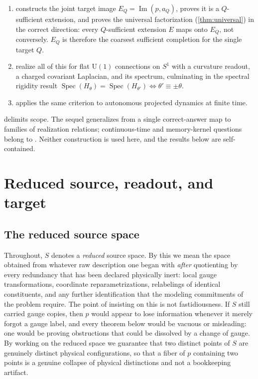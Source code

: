 \documentclass[11pt,reqno]{amsart}
\theoremstyle{plain}
\theoremstyle{definition}
\newcommand{\Uone}{\mathrm{U}(1)}
\newcommand{\Src}{S}
\newcommand{\Spec}{\operatorname{Spec}}
\newcommand{\Img}{\operatorname{Im}}
\begin{document}
\begin{enumerate}
\item {} constructs the joint target image $E_Q=\Img(p,a_Q)$, proves it is a
$Q$-sufficient extension, and proves the universal factorization
(\cref{thm:universal}) in the correct direction: every $Q$-sufficient extension $E$ maps onto
$E_Q$, not conversely. $E_Q$ is therefore the coarsest sufficient completion for the single
target $Q$.

\item {} realize all of this for flat $\Uone$
connections on $S^1$ with a curvature readout, a charged covariant Laplacian, and its spectrum,
culminating in the spectral rigidity result $\Spec(H_\theta)=\Spec(H_{\theta'})
\iff \theta'\equiv\pm\theta$.

\item {} applies the same criterion to autonomous projected dynamics at finite
time.
\end{enumerate}

 delimits scope. The sequel \cite{ShadowIII} generalizes from a single
correct-answer map to families of realization relations; continuous-time and memory-kernel
questions belong to \cite{ShadowV}. Neither construction is used here, and the results below are
self-contained.

\section{Reduced source, readout, and target}\label{sec:setup}

\subsection{The reduced source space}

Throughout, $\Src$ denotes a \emph{reduced} source space. By this we mean the space obtained
from whatever raw description one began with \emph{after} quotienting by every redundancy that
has been declared physically inert: local gauge transformations, coordinate reparametrizations,
relabelings of identical constituents, and any further identification that the modeling
commitments of the problem require. The point of insisting on this is not fastidiousness. If
$\Src$ still carried gauge copies, then $p$ would appear to lose information whenever it merely
forgot a gauge label, and every theorem below would be vacuous or misleading: one would be
proving obstructions that could be dissolved by a change of gauge. By working on the reduced
space we guarantee that two distinct points of $\Src$ are genuinely distinct physical
configurations, so that a fiber of $p$ containing two points is a genuine collapse of physical
distinctions and not a bookkeeping artifact.
\end{document}
